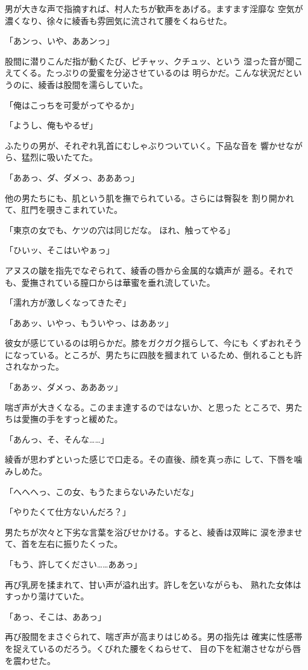 ﻿\documentclass[
    book,tate,
    line_length=30zw,
    jafontsize=12pt,
    paper=b5j,
    landscape,
    ]{jlreq}
\begin{document}
男が大きな声で指摘すれば、村人たちが歓声をあげる。ますます淫靡な
空気が濃くなり、徐々に綾香も雰囲気に流されて腰をくねらせた。

「あンっ、いや、ああンっ」

股間に潜りこんだ指が動くたび、ピチャッ、クチュッ、という
湿った音が聞こえてくる。たっぷりの愛蜜を分泌させているのは
明らかだ。こんな状況だというのに、綾香は股間を濡らしていた。

「俺はこっちを可愛がってやるか」

「ようし、俺もやるぜ」

ふたりの男が、それぞれ乳首にむしゃぶりついていく。下品な音を
響かせながら、猛烈に吸いたてた。

「ああっ、ダ、ダメっ、あああっ」

他の男たちにも、肌という肌を撫でられている。さらには臀裂を
割り開かれて、肛門を覗きこまれていた。

「東京の女でも、ケツの穴は同じだな。 ほれ、触ってやる」

「ひいッ、そこはいやぁっ」

アヌスの皺を指先でなぞられて、綾香の唇から金属的な嬌声が
遡る。それでも、愛撫されている膣口からは華蜜を垂れ流していた。

「濡れ方が激しくなってきたぞ」

「ああッ、いやっ、もういやっ、はああッ」

彼女が感じているのは明らかだ。膝をガクガク揺らして、今にも
くずおれそうになっている。ところが、男たちに四肢を摑まれて
いるため、倒れることも許されなかった。

「ああッ、ダメっ、あああッ」

喘ぎ声が大きくなる。このまま達するのではないか、と思った
ところで、男たちは愛撫の手をすっと緩めた。

「あんっ、そ、そんな……」

綾香が思わずといった感じで口走る。その直後、顔を真っ赤に
して、下唇を噛みしめた。

「へへへっ、この女、もうたまらないみたいだな」

「やりたくて仕方ないんだろ？」

男たちが次々と下劣な言葉を浴びせかける。すると、綾香は双眸に
涙を滲ませて、首を左右に振りたくった。

「もう、許してください……ああっ」

再び乳房を揉まれて、甘い声が溢れ出す。許しを乞いながらも、
熟れた女体はすっかり蕩けていた。

「あっ、そこは、ああっ」

再び股間をまさぐられて、喘ぎ声が高まりはじめる。男の指先は
確実に性感帯を捉えているのだろう。くびれた腰をくねらせて、
目の下を紅潮させながら唇を震わせた。
\end{document}
